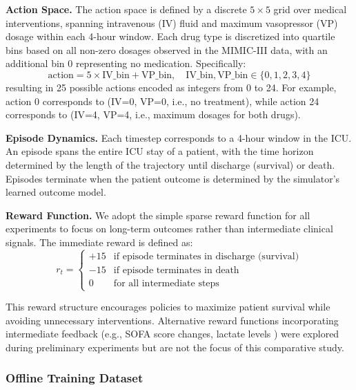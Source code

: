 \textbf{Action Space.} The action space is defined by a discrete $5 \times 5$ grid over medical interventions, spanning intravenous (IV) fluid and maximum vasopressor (VP) dosage within each 4-hour window. Each drug type is discretized into quartile bins based on all non-zero dosages observed in the MIMIC-III data, with an additional bin 0 representing no medication. Specifically:
\begin{equation}
\text{action} = 5 \times \text{IV\_bin} + \text{VP\_bin}, \quad \text{IV\_bin}, \text{VP\_bin} \in \{0, 1, 2, 3, 4\}
\end{equation}
resulting in 25 possible actions encoded as integers from 0 to 24. For example, action 0 corresponds to (IV=0, VP=0, i.e., no treatment), while action 24 corresponds to (IV=4, VP=4, i.e., maximum dosages for both drugs).

\textbf{Episode Dynamics.} Each timestep corresponds to a 4-hour window in the ICU. An episode spans the entire ICU stay of a patient, with the time horizon determined by the length of the trajectory until discharge (survival) or death. Episodes terminate when the patient outcome is determined by the simulator's learned outcome model.

\textbf{Reward Function.} We adopt the simple sparse reward function for all experiments to focus on long-term outcomes rather than intermediate clinical signals. The immediate reward is defined as:
\begin{equation}
r_t = \begin{cases}
+15 & \text{if episode terminates in discharge (survival)} \\
-15 & \text{if episode terminates in death} \\
0 & \text{for all intermediate steps}
\end{cases}
\end{equation}

This reward structure encourages policies to maximize patient survival while avoiding unnecessary interventions. Alternative reward functions incorporating intermediate feedback (e.g., SOFA score changes, lactate levels \citep{raghu2017sepsis_drl}) were explored during preliminary experiments but are not the focus of this comparative study.

\subsubsection{Offline Training Dataset}

